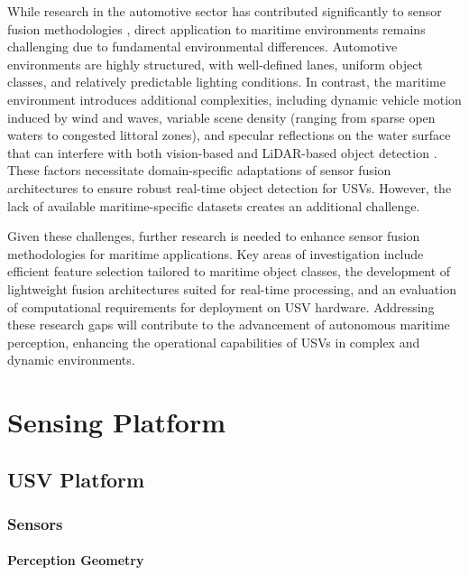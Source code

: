 \documentclass{erauthesis}
\begin{document}
While research in the automotive sector has contributed significantly to sensor fusion methodologies \cite{yeong2021,clunie2021,roriz2022,cui2022,das2022,liu2023a}, direct application to maritime environments remains challenging due to fundamental environmental differences. 
Automotive environments are highly structured, with well-defined lanes, uniform object classes, and relatively predictable lighting conditions. 
In contrast, the maritime environment introduces additional complexities, including dynamic vehicle motion induced by wind and waves, variable scene density (ranging from sparse open waters to congested littoral zones), and specular reflections on the water surface that can interfere with both vision-based \cite{liu2023a} and \ac{LiDAR}-based object detection \cite{ahmed2024}.%
These factors necessitate domain-specific adaptations of sensor fusion architectures to ensure robust real-time object detection for \acp{USV}. 
However, the lack of available maritime-specific datasets \cite{jun-hwa2022,su2023,thompson2023} creates an additional challenge.

Given these challenges, further research is needed to enhance sensor fusion methodologies for maritime applications. 
Key areas of investigation include efficient feature selection tailored to maritime object classes, the development of lightweight fusion architectures suited for real-time processing, and an evaluation of computational requirements for deployment on \ac{USV} hardware. 
Addressing these research gaps will contribute to the advancement of autonomous maritime perception, enhancing the operational capabilities of \acp{USV} in complex and dynamic environments.

\chapter{Sensing Platform}

    \section{USV Platform}

        \subsection{Sensors}
        
            \subsubsection{Perception Geometry}
            
\end{document}
